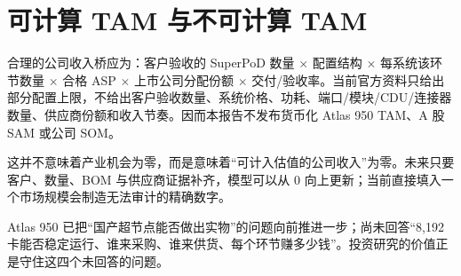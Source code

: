\section{可计算 TAM 与不可计算 TAM}

合理的公司收入桥应为：客户验收的 SuperPoD 数量 $\times$ 配置结构 $\times$ 每系统该环节数量 $\times$ 合格 ASP $\times$ 上市公司分配份额 $\times$ 交付/验收率。当前官方资料只给出部分配置上限，不给出客户验收数量、系统价格、功耗、端口/模块/CDU/连接器数量、供应商份额和收入节奏。因而本报告不发布货币化 Atlas 950 TAM、A 股 SAM 或公司 SOM。

这并不意味着产业机会为零，而是意味着“可计入估值的公司收入”为零。未来只要客户、数量、BOM 与供应商证据补齐，模型可以从 0 向上更新；当前直接填入一个市场规模会制造无法审计的精确数字。

\begin{keyinsight}[行业判断]
Atlas 950 已把“国产超节点能否做出实物”的问题向前推进一步；尚未回答“8,192 卡能否稳定运行、谁来采购、谁来供货、每个环节赚多少钱”。投资研究的价值正是守住这四个未回答的问题。
\end{keyinsight}
